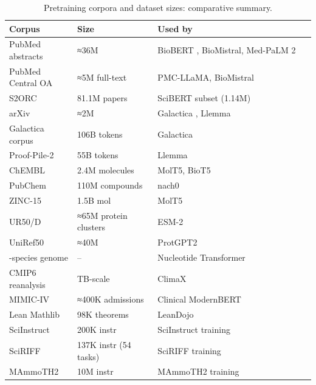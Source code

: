 \documentclass{article}
\begin{document}
\begin{table}[t]
\centering
\caption{Pretraining corpora and dataset sizes: comparative summary.}
\label{tab:pretraining-corpora-and-dataset-sizes}
\begin{tabular}{>{\raggedright\arraybackslash}p{0.2250\linewidth}
  >{\raggedright\arraybackslash}p{0.2625\linewidth}
  >{\raggedright\arraybackslash}p{0.5125\linewidth}}
\toprule
Corpus & Size & Used by \\
\midrule
PubMed abstracts & ≈36M & BioBERT \cite{lee2019bioinformatics2019}, BioMistral, Med-PaLM 2 \cite{singhal2025towardexpertlevelm} \\
PubMed Central OA & ≈5M full-text & PMC-LLaMA, BioMistral \\
S2ORC & 81.1M papers & SciBERT subset (1.14M) \cite{beltagy2019arxiv1903106762019} \\
arXiv & ≈2M & Galactica \cite{taylor2022arxiv2211090852022}, Llemma \cite{azerbayev2023llemmaanopenlangua} \\
Galactica corpus & 106B tokens & Galactica \cite{taylor2022arxiv2211090852022} \\
Proof-Pile-2 & 55B tokens & Llemma \cite{azerbayev2023llemmaanopenlangua} \\
ChEMBL & 2.4M molecules & MolT5, BioT5 \\
PubChem & 110M compounds & nach0 \cite{livne2024nach0multimodalnat} \\
ZINC-15 & 1.5B mol & MolT5 \cite{edwards2022emnlp2022} \\
UR50/D & ≈65M protein clusters & ESM-2 \cite{lin2022evolutionaryscalep} \\
UniRef50 & ≈40M & ProtGPT2 \cite{ferruz2022naturecommunicatio} \\
850-species genome & -- & Nucleotide Transformer \cite{dallatorre2024nucleotidetransfor} \\
CMIP6 reanalysis & TB-scale & ClimaX \cite{nguyen2023arxiv2301103432023} \\
MIMIC-IV & ≈400K admissions & Clinical ModernBERT \cite{lee2025arxiv2504039642025} \\
Lean Mathlib & 98K theorems & LeanDojo \cite{yang2023leandojotheorempro} \\
SciInstruct & 200K instr & SciInstruct training \cite{zhang2024sciinstructaselfre} \\
SciRIFF & 137K instr (54 tasks) & SciRIFF training \cite{wadden2024sciriffaresourceto} \\
MAmmoTH2 & 10M instr & MAmmoTH2 training \cite{yue2024mammoth2scalingins} \\
\end{tabular}
\end{table}
\end{document}
